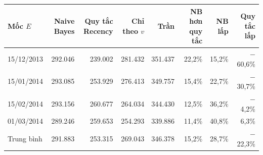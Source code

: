 \begin{tabular}{lrrrrrrr}
\toprule
Mốc $E$ & Naive Bayes & Quy tắc Recency & Chỉ theo $v$ & Trần & NB hơn quy tắc & NB lấp & Quy tắc lấp \\
\midrule
15/12/2013 & 292.046 & 239.002 & 281.432 & 351.437 & 22,2\% & 15,2\% & $-$60,6\% \\
15/01/2014 & 293.085 & 253.929 & 276.413 & 349.757 & 15,4\% & 22,7\% & $-$30,7\% \\
15/02/2014 & 293.156 & 260.677 & 264.034 & 344.430 & 12,5\% & 36,2\% & $-$4,2\% \\
01/03/2014 & 289.246 & 259.653 & 254.293 & 339.886 & 11,4\% & 40,8\% & 6,3\% \\
Trung bình & 291.883 & 253.315 & 269.043 & 346.378 & 15,2\% & 28,7\% & $-$22,3\% \\
\bottomrule
\end{tabular}
